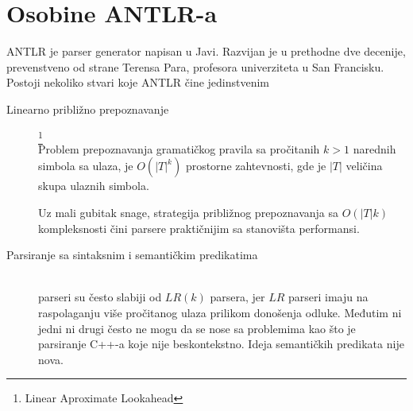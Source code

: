 \section{Osobine ANTLR-a}

ANTLR je parser generator napisan u Javi. 
Razvijan je u prethodne dve decenije, prevenstveno od strane Terensa Para, profesora univerziteta u San Francisku.
Postoji nekoliko stvari koje ANTLR čine jedinstvenim
\begin{description}

	\item[Linearno približno prepoznavanje]\footnote{\eng Linear Aproximate Lookahead} \hfill \\
	Problem prepoznavanja gramatičkog pravila sa pročitanih $k > 1$ narednih simbola sa ulaza, je $O(|T|^{k})$ prostorne zahtevnosti, gde je $|T|$ veličina skupa ulaznih simbola. 
	
	Uz mali gubitak snage, strategija približnog prepoznavanja sa $O(|T|k)$ kompleksnosti čini \LLk parsere praktičnijim sa stanovišta performansi.
	\item[Parsiranje sa sintaksnim i semantičkim predikatima] \hfill \\
	\LLk parseri su često slabiji od $LR(k)$ parsera, jer $LR$ parseri imaju na raspolaganju više pročitanog ulaza prilikom donošenja odluke. Međutim ni jedni ni drugi često ne mogu da se nose sa problemima kao što je parsiranje C++-a koje nije beskontekstno. Ideja semantičkih predikata nije nova\cite{attributed-transations}.




\end{description}

